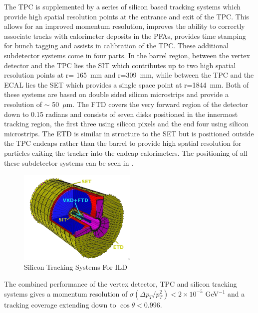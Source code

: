 The \ac{TPC} is supplemented by a series of silicon based tracking systems which provide high spatial resolution points at the entrance and exit of the TPC. This allows for an improved momentum resolution, improves the ability to correctly associate tracks with calorimeter deposits in the \ac{PFA}s, provides time stamping for bunch tagging and assists in calibration of the \ac{TPC}. These additional subdetector systems come in four parts. In the barrel region, between the vertex detector and the \ac{TPC} lies the \ac{SIT} which contributes up to two high spatial resolution points at r= 165~mm and r=309~mm, while between the \ac{TPC} and the \ac{ECAL} lies the \ac{SET} which provides a single space point at r=1844~mm. Both of these systems are based on double sided silicon microstrips and provide a resolution of $\sim$ 50~$\mu$m. The \ac{FTD} covers the very forward region of the detector down to 0.15 radians and consists of seven disks positioned in the innermost tracking region, the first three using silicon pixels and the end four using silicon microstrips. The \ac{ETD} is similar in structure to the \ac{SET} but is positioned outside the \ac{TPC} endcaps rather than the barrel to provide high spatial resolution for particles exiting the tracker into the endcap calorimeters. The positioning of all these subdetector systems can be seen in .

\begin{figure}
  \centering
  \includegraphics[width=0.5\textwidth,keepaspectratio]{Experiments/fig/SiliconTrackers}
  \caption[Silicon Tracking Systems For ILD]{Silicon Tracking Systems For ILD \cite{ILD}}
  \label{fig:silicontracking}
\end{figure}

The combined performance of the vertex detector, \ac{TPC} and silicon tracking systems gives a momentum resolution of $\sigma(\Delta p_T/ p_{T}^2) < 2 \times 10^{-5}$ GeV$^{-1}$ and a tracking coverage extending down to $\cos\theta<$0.996.



